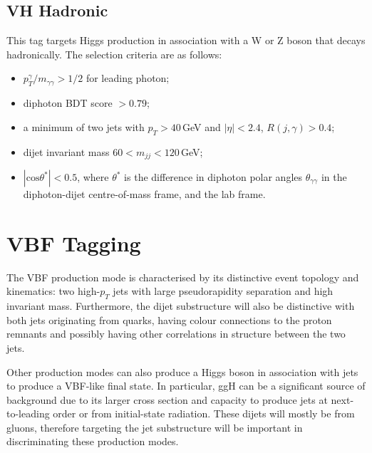 \subsection{VH Hadronic}
This tag targets Higgs production in association with a W or Z boson that decays hadronically. The selection criteria are as follows:
\begin{itemize}[noitemsep]
    \item $p^{\gamma}_{T}/m_{\gamma\gamma} > 1/2$ for leading photon;
    \item diphoton BDT score $> 0.79$;
    \item a minimum of two jets with $p_T > 40$\,GeV and $|\eta| < 2.4$, $R(j,\gamma) > 0.4$;
    \item dijet invariant mass $60 < m_{jj} < 120$\,GeV;
    \item $|\mathrm{cos}{\theta^{*}}| < 0.5$, where $\theta^{*}$ is the difference in diphoton polar angles $\theta_{\gamma\gamma}$ in the diphoton-dijet centre-of-mass frame, and the lab frame.  
\end{itemize}













\section{VBF Tagging}
The VBF production mode is characterised by its distinctive event topology and kinematics: two high-$p_{T}$ jets with large pseudorapidity separation and high invariant mass. Furthermore, the dijet substructure will also be distinctive with both jets originating from quarks, having colour connections to the proton remnants and possibly having other correlations in structure between the two jets. 

Other production modes can also produce a Higgs boson in association with jets to produce a VBF-like final state. 
In particular, ggH can be a significant source of background due to its larger cross section and capacity to produce jets at next-to-leading order or from initial-state radiation. 
These dijets will mostly be from gluons, therefore targeting the jet substructure will be important in discriminating these production modes. 


